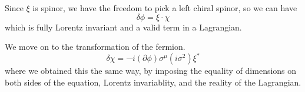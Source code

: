 Since $\xi$ is spinor, we have the freedom to pick a left chiral spinor, so we can have
\begin{equation}
    \delta \phi = \xi \cdot \chi
    \label{eqn:5:boson transformation}
\end{equation}
which is fully Lorentz invariant and a valid term in a Lagrangian.

We move on to the transformation of the fermion.
\begin{equation}
    \delta \chi = -i (\partial\phi) \sigma^\mu (i\sigma^2) \xi^*
    \label{eqn:5:fermion transformation}
\end{equation}
where we obtained this the same way, by imposing the equality of dimensions on both sides of the equation, Lorentz invariablity, and the reality of the Lagrangian.

